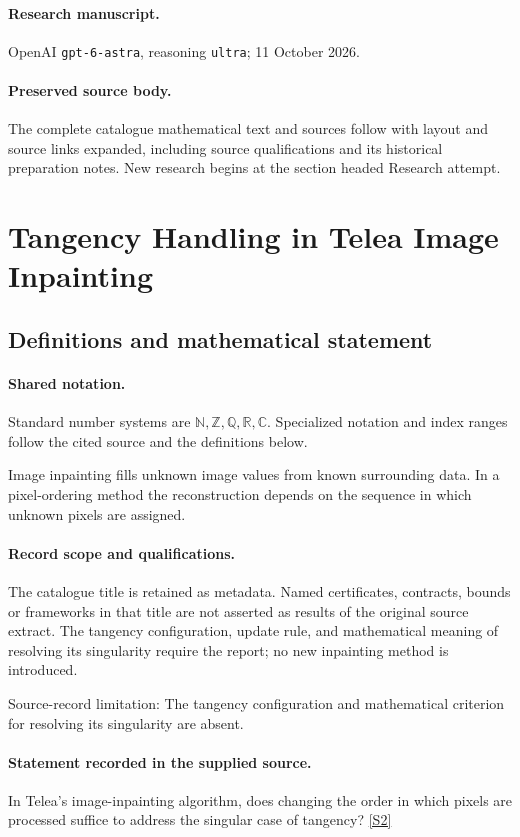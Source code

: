 \documentclass[11pt]{article}
\begin{document}
\paragraph{Research manuscript.} OpenAI \texttt{gpt-6-astra}, reasoning \texttt{ultra}; 11 October 2026.
\paragraph{Preserved source body.} The complete catalogue mathematical text and sources follow with layout and source links expanded, including source qualifications and its historical preparation notes. New research begins at the section headed Research attempt.

\section{Tangency Handling in Telea Image Inpainting}\label{statement}

\subsection{Definitions and mathematical statement}

\paragraph{Shared notation.}Standard number systems are $\mathbb N,\mathbb Z,\mathbb Q,\mathbb R,\mathbb C$. Specialized notation and index ranges follow the cited source and the definitions below.


Image inpainting fills unknown image values from known surrounding data. In a pixel-ordering method the reconstruction depends on the sequence in which unknown pixels are assigned.
\paragraph{Record scope and qualifications.}
The catalogue title is retained as metadata. Named certificates, contracts, bounds or frameworks in that title are not asserted as results of the original source extract.
The tangency configuration, update rule, and mathematical meaning of resolving its singularity require the report; no new inpainting method is introduced.

Source-record limitation: The tangency configuration and mathematical criterion for resolving its singularity are absent.
\paragraph{Statement recorded in the supplied source.}
In Telea's image-inpainting algorithm, does changing the order in which pixels are processed suffice to address the singular case of tangency? \href{https://doi.org/10.4171/owr/2007/03}{[S2]}
\end{document}
